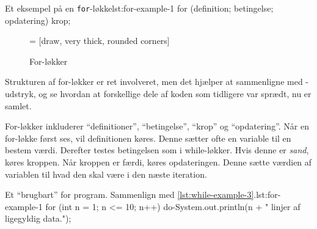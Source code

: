		\begin{JavaCode}{Et eksempel på en \texttt{for}-løkke}{lst:for-example-1}
			for (definition; betingelse; opdatering) {
				krop;
			}
		\end{JavaCode}

        \begin{figure}
        \center
         = [draw, very thick, rounded corners]
        \caption{For-løkker}
        \label{fig:for-loop-illustrated}
        \end{figure}

		Strukturen af for-løkker er ret involveret, men det hjælper at
		sammenligne med -udstryk, og se hvordan at forskellige
		dele af koden som tidligere var sprædt, nu er samlet.

        For-løkker inkluderer ``definitioner'', ``betingelse'',
        ``krop'' og ``opdatering''. Når en for-løkke først ses, vil
        definitionen køres. Denne sætter ofte en variable til en
        bestem værdi. Derefter testes betingelsen som i while-løkker.
        Hvis denne er \emph{sand}, køres kroppen. Når kroppen er
        færdi, køres opdateringen. Denne sætte værdien af variablen
        til hvad den skal være i den næste iteration.

		\begin{JavaCode}{Et ``brugbart'' for program. Sammenlign med \autoref{lst:while-example-3}.}{lst:for-example-1}
			for (int n = 1; n <= 10; n++) {
				do-System.out.println(n + " linjer af ligegyldig data.");
			}
		\end{JavaCode}

